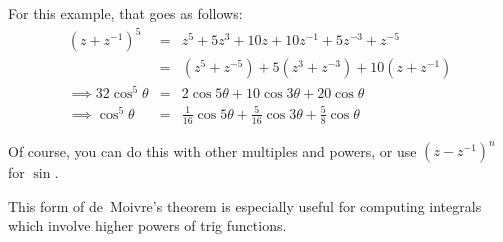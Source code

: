 \documentclass[../main.tex]{subfile}
\begin{document}
For this example, that goes as follows:
\begin{eqnarray*}
	(z + z^{-1})^5 &=& z^5 + 5z^3 + 10z + 10z^{-1} + 5z^{-3} + z^{-5}\\
	&=& (z^5 + z^{-5}) + 5(z^3 + z^{-3}) + 10(z + z^{-1})\\
	\implies 32\cos^5\theta &=& 2\cos 5\theta + 10\cos 3\theta + 20\cos\theta\\
	\implies \cos^5\theta &=& \frac{1}{16}\cos 5\theta + \frac{5}{16}\cos 3\theta + \frac{5}{8}\cos\theta
\end{eqnarray*}

Of course, you can do this with other multiples and powers, or use $(z - z^{-1})^n$ for $\sin$.

This form of de~Moivre's theorem is especially useful for computing integrals which involve higher powers of trig functions.
\end{document}
